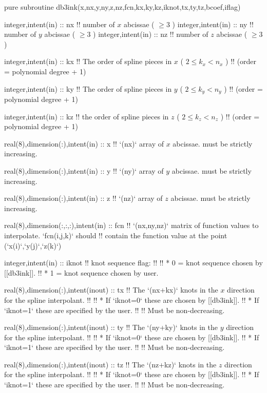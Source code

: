 \begin{fortrancode}
pure subroutine db3ink(x,nx,y,ny,z,nz,fcn,kx,ky,kz,iknot,tx,ty,tz,bcoef,iflag)

  integer,intent(in) :: nx !! number of \(x\) abcissae ( $ \ge 3 $ )
  integer,intent(in) :: ny !! number of \(y\) abcissae ( $ \ge 3 $ )
  integer,intent(in) :: nz !! number of \(z\) abcissae ( $ \ge 3 $ )

  integer,intent(in) :: kx
  !! The order of spline pieces in \(x\) ( \( 2 \le k_x < n_x \) )
  !! (order = polynomial degree + 1)

  integer,intent(in) :: ky
  !! The order of spline pieces in \(y\) ( \( 2 \le k_y < n_y \) )
  !! (order = polynomial degree + 1)

  integer,intent(in) :: kz
  !! the order of spline pieces in \(z\) ( \( 2 \le k_z < n_z \) )
  !! (order = polynomial degree + 1)

  real(8),dimension(:),intent(in) :: x
  !! `(nx)` array of $x$ abcissae. must be strictly increasing.

  real(8),dimension(:),intent(in) :: y
  !! `(ny)` array of $y$ abcissae. must be strictly increasing.

  real(8),dimension(:),intent(in) :: z
  !! `(nz)` array of $z$ abcissae. must be strictly increasing.

  real(8),dimension(:,:,:),intent(in) :: fcn
  !! `(nx,ny,nz)` matrix of function values to interpolate. `fcn(i,j,k)` should
  !! contain the function value at the point (`x(i)`,`y(j)`,`z(k)`)

  integer,intent(in) :: iknot
  !! knot sequence flag:
  !!
  !! * 0 = knot sequence chosen by [[db3ink]].
  !! * 1 = knot sequence chosen by user.

  real(8),dimension(:),intent(inout) :: tx
  !! The `(nx+kx)` knots in the \(x\) direction for the spline interpolant.
  !!
  !! * If `iknot=0` these are chosen by [[db3ink]].
  !! * If `iknot=1` these are specified by the user.
  !!
  !! Must be non-decreasing.

  real(8),dimension(:),intent(inout) :: ty
  !! The `(ny+ky)` knots in the \(y\) direction for the spline interpolant.
  !!
  !! * If `iknot=0` these are chosen by [[db3ink]].
  !! * If `iknot=1` these are specified by the user.
  !!
  !! Must be non-decreasing.

  real(8),dimension(:),intent(inout) :: tz
  !! The `(nz+kz)` knots in the $z$ direction for the spline interpolant.
  !!
  !! * If `iknot=0` these are chosen by [[db3ink]].
  !! * If `iknot=1` these are specified by the user.
  !!
  !! Must be non-decreasing.


\end{fortrancode}
